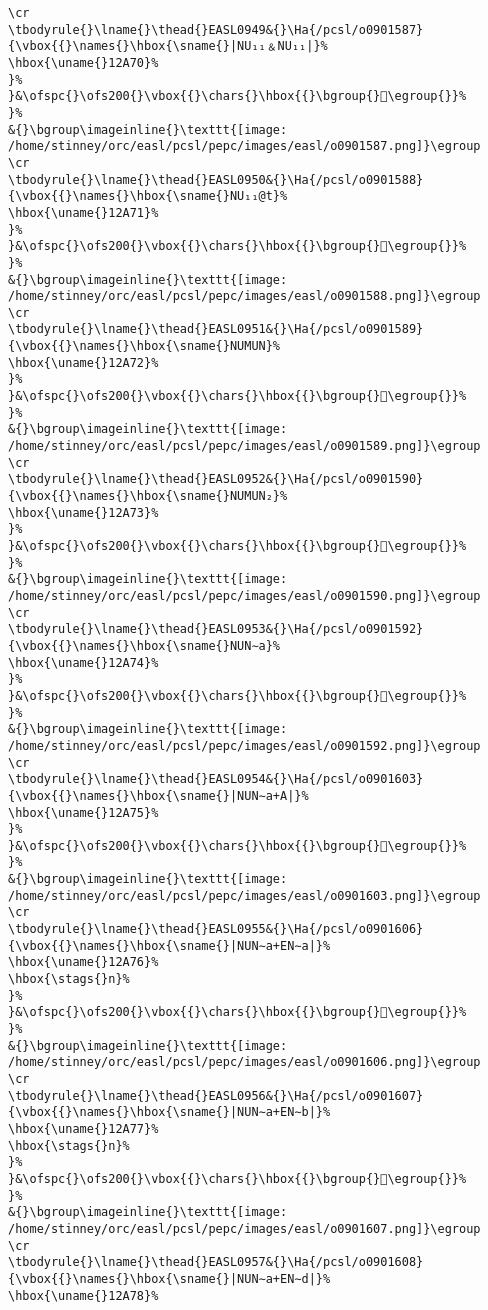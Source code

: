 \begin{verbatim}
\cr
\tbodyrule{}\lname{}\thead{}EASL0949&{}\Ha{/pcsl/o0901587}{\vbox{{}\names{}\hbox{\sname{}|NU₁₁﹠NU₁₁|}%
\hbox{\uname{}12A70}%
}%
}&\ofspc{}\ofs200{}\vbox{{}\chars{}\hbox{{}\bgroup{}𒩰\egroup{}}%
}%
&{}\bgroup\imageinline{}\texttt{[image: /home/stinney/orc/easl/pcsl/pepc/images/easl/o0901587.png]}\egroup
\cr
\tbodyrule{}\lname{}\thead{}EASL0950&{}\Ha{/pcsl/o0901588}{\vbox{{}\names{}\hbox{\sname{}NU₁₁@t}%
\hbox{\uname{}12A71}%
}%
}&\ofspc{}\ofs200{}\vbox{{}\chars{}\hbox{{}\bgroup{}𒩱\egroup{}}%
}%
&{}\bgroup\imageinline{}\texttt{[image: /home/stinney/orc/easl/pcsl/pepc/images/easl/o0901588.png]}\egroup
\cr
\tbodyrule{}\lname{}\thead{}EASL0951&{}\Ha{/pcsl/o0901589}{\vbox{{}\names{}\hbox{\sname{}NUMUN}%
\hbox{\uname{}12A72}%
}%
}&\ofspc{}\ofs200{}\vbox{{}\chars{}\hbox{{}\bgroup{}𒩲\egroup{}}%
}%
&{}\bgroup\imageinline{}\texttt{[image: /home/stinney/orc/easl/pcsl/pepc/images/easl/o0901589.png]}\egroup
\cr
\tbodyrule{}\lname{}\thead{}EASL0952&{}\Ha{/pcsl/o0901590}{\vbox{{}\names{}\hbox{\sname{}NUMUN₂}%
\hbox{\uname{}12A73}%
}%
}&\ofspc{}\ofs200{}\vbox{{}\chars{}\hbox{{}\bgroup{}𒩳\egroup{}}%
}%
&{}\bgroup\imageinline{}\texttt{[image: /home/stinney/orc/easl/pcsl/pepc/images/easl/o0901590.png]}\egroup
\cr
\tbodyrule{}\lname{}\thead{}EASL0953&{}\Ha{/pcsl/o0901592}{\vbox{{}\names{}\hbox{\sname{}NUN∼a}%
\hbox{\uname{}12A74}%
}%
}&\ofspc{}\ofs200{}\vbox{{}\chars{}\hbox{{}\bgroup{}𒩴\egroup{}}%
}%
&{}\bgroup\imageinline{}\texttt{[image: /home/stinney/orc/easl/pcsl/pepc/images/easl/o0901592.png]}\egroup
\cr
\tbodyrule{}\lname{}\thead{}EASL0954&{}\Ha{/pcsl/o0901603}{\vbox{{}\names{}\hbox{\sname{}|NUN∼a+A|}%
\hbox{\uname{}12A75}%
}%
}&\ofspc{}\ofs200{}\vbox{{}\chars{}\hbox{{}\bgroup{}𒩵\egroup{}}%
}%
&{}\bgroup\imageinline{}\texttt{[image: /home/stinney/orc/easl/pcsl/pepc/images/easl/o0901603.png]}\egroup
\cr
\tbodyrule{}\lname{}\thead{}EASL0955&{}\Ha{/pcsl/o0901606}{\vbox{{}\names{}\hbox{\sname{}|NUN∼a+EN∼a|}%
\hbox{\uname{}12A76}%
\hbox{\stags{}n}%
}%
}&\ofspc{}\ofs200{}\vbox{{}\chars{}\hbox{{}\bgroup{}𒩶\egroup{}}%
}%
&{}\bgroup\imageinline{}\texttt{[image: /home/stinney/orc/easl/pcsl/pepc/images/easl/o0901606.png]}\egroup
\cr
\tbodyrule{}\lname{}\thead{}EASL0956&{}\Ha{/pcsl/o0901607}{\vbox{{}\names{}\hbox{\sname{}|NUN∼a+EN∼b|}%
\hbox{\uname{}12A77}%
\hbox{\stags{}n}%
}%
}&\ofspc{}\ofs200{}\vbox{{}\chars{}\hbox{{}\bgroup{}𒩷\egroup{}}%
}%
&{}\bgroup\imageinline{}\texttt{[image: /home/stinney/orc/easl/pcsl/pepc/images/easl/o0901607.png]}\egroup
\cr
\tbodyrule{}\lname{}\thead{}EASL0957&{}\Ha{/pcsl/o0901608}{\vbox{{}\names{}\hbox{\sname{}|NUN∼a+EN∼d|}%
\hbox{\uname{}12A78}%

\end{verbatim}
